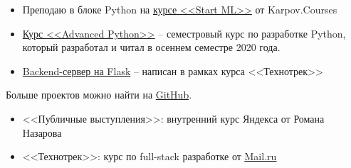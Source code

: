 
\begin{itemize}
    \item Преподаю в блоке Python на \href{https://karpov.courses/ml-start}{курсе <<Start ML>>} от Karpov.Courses
    \item \href{https://github.com/alekseik1/advanced_python_1sem_2020}{Курс <<Advanced Python>>} -- семестровый курс по разработке Python, который разработал и читал в осеннем семестре 2020 года.
    \item \href{https://github.com/alekseik1/tt-ridesharing-backend}{Backend-сервер на Flask} -- написан в рамках курса <<Технотрек>>
\end{itemize}
Больше проектов можно найти на \href{https://github.com/alekseik1/}{GitHub}.

\begin{itemize}
    \item <<Публичные выступления>>: внутренний курс Яндекса от Романа Назарова
	\item <<Технотрек>>: курс по full-stack разработке от \href{https://track.mail.ru/}{\underline{Mail.ru}}
\end{itemize}

